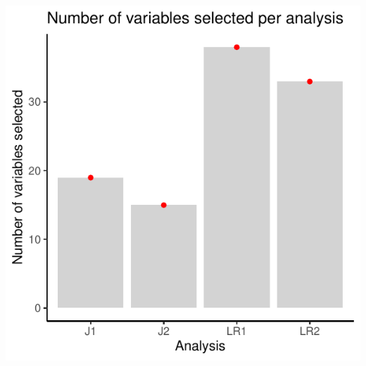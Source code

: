 \documentclass[
  letterpaper,
  DIV=11,
  numbers=noendperiod]{scrreprt}
\begin{document}
\includegraphics{02_rfe_files/figure-pdf/rfe-results-eval-1.pdf}
\end{document}
